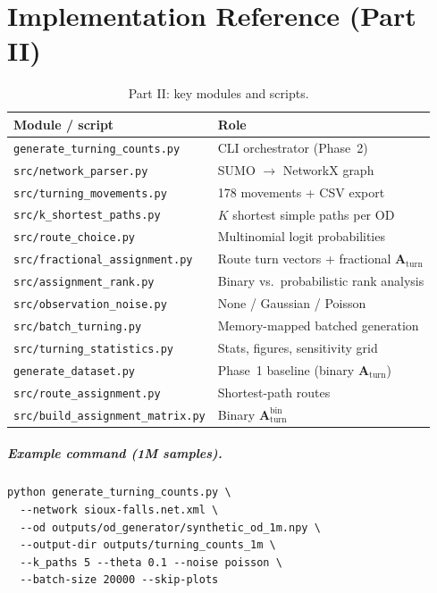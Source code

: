 \documentclass[11pt,a4paper]{report}
\newcommand{\Aturn}{\mathbf{A}_{\mathrm{turn}}}
\begin{document}
\chapter{Implementation Reference (Part II)}
\label{ch:impl2}

\begin{table}[ht]
\centering
\caption{Part II: key modules and scripts.}
\label{tab:impl2}
\small
\begin{tabular}{@{}ll@{}}
\toprule
\textbf{Module / script} & \textbf{Role} \\
\midrule
\texttt{generate\_turning\_counts.py} & CLI orchestrator (Phase~2) \\
\texttt{src/network\_parser.py} & SUMO $\to$ NetworkX graph \\
\texttt{src/turning\_movements.py} & 178 movements + CSV export \\
\texttt{src/k\_shortest\_paths.py} & $K$ shortest simple paths per OD \\
\texttt{src/route\_choice.py} & Multinomial logit probabilities \\
\texttt{src/fractional\_assignment.py} & Route turn vectors + fractional $\Aturn$ \\
\texttt{src/assignment\_rank.py} & Binary vs.\ probabilistic rank analysis \\
\texttt{src/observation\_noise.py} & None / Gaussian / Poisson \\
\texttt{src/batch\_turning.py} & Memory-mapped batched generation \\
\texttt{src/turning\_statistics.py} & Stats, figures, sensitivity grid \\
\midrule
\texttt{generate\_dataset.py} & Phase~1 baseline (binary $\Aturn$) \\
\texttt{src/route\_assignment.py} & Shortest-path routes \\
\texttt{src/build\_assignment\_matrix.py} & Binary $\Aturn^{\mathrm{bin}}$ \\
\bottomrule
\end{tabular}
\end{table}

\paragraph{Example command (1M samples).}
\begin{verbatim}
python generate_turning_counts.py \
  --network sioux-falls.net.xml \
  --od outputs/od_generator/synthetic_od_1m.npy \
  --output-dir outputs/turning_counts_1m \
  --k_paths 5 --theta 0.1 --noise poisson \
  --batch-size 20000 --skip-plots
\end{verbatim}
\end{document}
